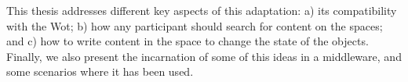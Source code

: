 This thesis addresses different key aspects of this adaptation:
a) its compatibility with the Wot;
b) how any participant should search for content on the spaces;
and c) how to write content in the space to change the state of the objects.
Finally, we also present the incarnation of some of this ideas in a middleware,
and some scenarios where it has been used.